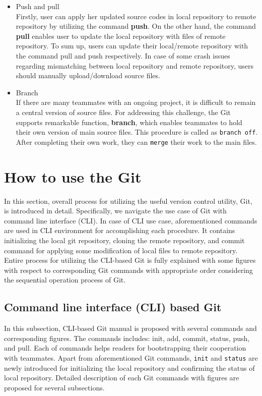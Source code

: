 \documentclass{article}
\begin{document}
\begin{itemize}
    \item Push and pull \\
    \hspace*{1mm} Firstly, user can apply her updated source codes in local repository to remote repository by utilizing the command \textbf{push}. On the other hand, the command \textbf{pull} enables user to update the local repository with files of remote repository. To sum up, users can update their local/remote repository with the command pull and push respectively. In case of some crash issues regarding mismatching between local repository and remote repository, users should manually upload/download source files.
    
    \item Branch \\
    \hspace*{1mm} If there are many teammates with an ongoing project, it is difficult to remain a central version of source files. For addressing this challenge, the Git supports remarkable function, \textbf{branch}, which enables teammates to hold their own version of main source files. This procedure is called as \texttt{branch off}. After completing their own work, they can \texttt{merge} their work to the main files.

\end{itemize}

\section{How to use the Git}
\hspace*{2mm}In this section, overall process for utilizing the useful version control utility, Git, is introduced in detail. Specifically, we navigate the use case of Git with command line interface (CLI). In case of CLI use case, aforementioned commands are used in CLI environment for accomplishing each procedure. It contains initializing the local git repository, cloning the remote repository, and commit command for applying some modification of local files to remote repository. Entire process for utilizing the CLI-based Git is fully explained with some figures with respect to corresponding Git commands with appropriate order considering the sequential operation process of Git. 

\subsection{Command line interface (CLI) based Git}
\hspace*{2mm}In this subsection, CLI-based Git manual is proposed with several commands and corresponding figures. The commands includes: init, add, commit, status, push, and pull. Each of commands helps readers for bootstrapping their cooperation with teammates. Apart from aforementioned Git commands, \texttt{init} and \texttt{status} are newly introduced for initializing the local repository and confirming the status of local repository. Detailed description of each Git commands with figures are proposed for several subsections.
\end{document}
